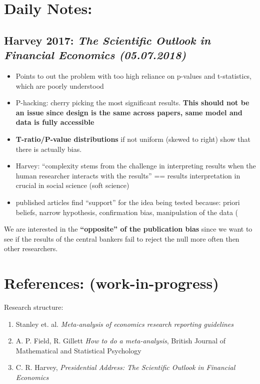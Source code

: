 \documentclass{article}
\begin{document}
\section*{Daily Notes:}

\subsection*{Harvey 2017: \textit{The Scientific Outlook in Financial Economics (05.07.2018)}}
	\begin{itemize}
		\item Points to out the problem with too high reliance on p-values and t-statistics, which are poorly understood
		\item P-hacking: cherry picking the most significant results. \textbf{This should not be an issue since design is the same across papers, same model and data is fully accessible}
		\item \textbf{T-ratio/P-value distributions} if not uniform (skewed to right) show that there is actually bias.
		 \item Harvey: ``complexity stems from the challenge in interpreting results when the human researcher interacts with the results''  == results interpretation in crucial in social science (soft science)
		 \item published articles find ``support'' for the idea being tested because: priori beliefs, narrow hypothesis, confirmation bias, manipulation of the data (
	\end{itemize}
We are interested in the \textbf{``opposite'' of the publication bias} since we want to see if the results of the central bankers fail to reject the null more often then other researchers. 
\section*{References: (work-in-progress)}

Research structure: 

\begin{enumerate}
    \item Stanley et. al. \textit{Meta-analysis of economics research reporting guidelines}
    \item A. P. Field, R. Gillett \textit{How to do a meta-analysis}, British Journal of Mathematical and Statistical Psychology
    \item C. R. Harvey, \textit{Presidential Address: The Scientific Outlook in Financial Economics}
\end{enumerate}
\end{document}
